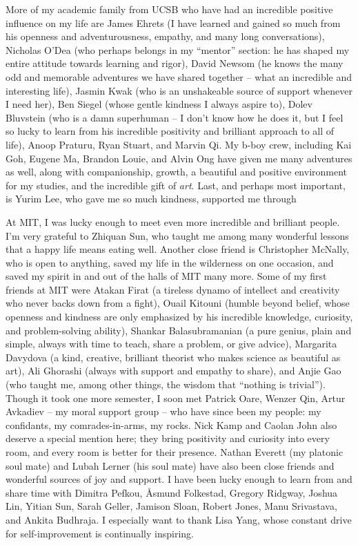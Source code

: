 More of my academic family from UCSB who have had an incredible positive influence on my life are James Ehrets (I have learned and gained so much from his openness and adventurousness, empathy, and many long conversations), Nicholas O'Dea (who perhaps belongs in my ``mentor'' section: he has shaped my entire attitude towards learning and rigor), David Newsom (he knows the many odd and memorable adventures we have shared together -- what an incredible and interesting life), Jasmin Kwak (who is an unshakeable source of support whenever I need her), Ben Siegel (whose gentle kindness I always aspire to), Dolev Bluvstein (who is a damn superhuman -- I don't know how he does it, but I feel so lucky to learn from his incredible positivity and brilliant approach to all of life), Anoop Praturu, Ryan Stuart, and Marvin Qi.
%
My b-boy crew, including Kai Goh, Eugene Ma, Brandon Louie, and Alvin Ong have given me many adventures as well, along with companionship, growth, a beautiful and positive environment for my studies, and the incredible gift of \emph{art}.
%
Last, and perhaps most important, is Yurim Lee, who gave me so much kindness, supported me through


At MIT, I was lucky enough to meet even more incredible and brilliant people.
%
I'm very grateful to Zhiquan Sun, who taught me among many wonderful lessons that a happy life means eating well.
%
Another close friend is Christopher McNally, who is open to anything, saved my life in the wilderness on one occasion, and saved my spirit in and out of the halls of MIT many more.
%
Some of my first friends at MIT were Atakan Firat (a tireless dynamo of intellect and creativity who never backs down from a fight), Ouail Kitouni (humble beyond belief, whose openness and kindness are only emphasized by his incredible knowledge, curiosity, and problem-solving ability), Shankar Balasubramanian (a pure genius, plain and simple, always with time to teach, share a problem, or give advice), Margarita Davydova (a kind, creative, brilliant theorist who makes science as beautiful as art), Ali Ghorashi (always with support and empathy to share), and Anjie Gao (who taught me, among other things, the wisdom that ``nothing is trivial'').
%
Though it took one more semester, I soon met Patrick Oare, Wenzer Qin, Artur Avkadiev -- my moral support group -- who have since been my people:
%
my confidants, my comrades-in-arms, my rocks.
%
Nick Kamp and Caolan John also deserve a special mention here;
%
they bring positivity and curiosity into every room, and every room is better for their presence.
%
Nathan Everett (my platonic soul mate) and Lubah Lerner (his soul mate) have also been close friends and wonderful sources of joy and support.
%
I have been lucky enough to learn from and share time with Dimitra Pefkou, \r{A}smund Folkestad, Gregory Ridgway, Joshua Lin, Yitian Sun, Sarah Geller, Jamison Sloan, Robert Jones, Manu Srivastava, and Ankita Budhraja.
%
I especially want to thank Lisa Yang, whose constant drive for self-improvement is continually inspiring.


